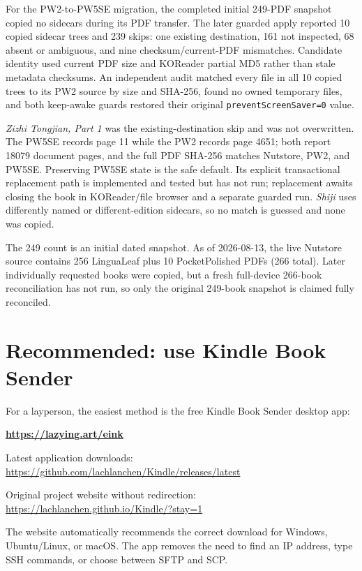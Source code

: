 \documentclass[10pt,letterpaper]{article}
\begin{document}
For the PW2-to-PW5SE migration, the completed initial 249-PDF snapshot copied no sidecars during its PDF transfer. The later guarded apply reported 10 copied sidecar trees and 239 skips: one existing destination, 161 not inspected, 68 absent or ambiguous, and nine checksum/current-PDF mismatches. Candidate identity used current PDF size and KOReader partial MD5 rather than stale metadata checksums. An independent audit matched every file in all 10 copied trees to its PW2 source by size and SHA-256, found no owned temporary files, and both keep-awake guards restored their original \texttt{preventScreenSaver=0} value.

\emph{Zizhi Tongjian, Part 1} was the existing-destination skip and was not overwritten. The PW5SE records page 11 while the PW2 records page 4651; both report 18079 document pages, and the full PDF SHA-256 matches Nutstore, PW2, and PW5SE. Preserving PW5SE state is the safe default. Its explicit transactional replacement path is implemented and tested but has not run; replacement awaits closing the book in KOReader/file browser and a separate guarded run. \emph{Shiji} uses differently named or different-edition sidecars, so no match is guessed and none was copied.

The 249 count is an initial dated snapshot. As of 2026-08-13, the live Nutstore source contains 256 LinguaLeaf plus 10 PocketPolished PDFs (266 total). Later individually requested books were copied, but a fresh full-device 266-book reconciliation has not run, so only the original 249-book snapshot is claimed fully reconciled.

\section{Recommended: use Kindle Book Sender}

For a layperson, the easiest method is the free Kindle Book Sender desktop app:

\begin{center}
\href{https://lazying.art/eink}{\textbf{https://lazying.art/eink}}

Latest application downloads: \url{https://github.com/lachlanchen/Kindle/releases/latest}

Original project website without redirection: \url{https://lachlanchen.github.io/Kindle/?stay=1}
\end{center}

The website automatically recommends the correct download for Windows, Ubuntu/Linux, or macOS. The app removes the need to find an IP address, type SSH commands, or choose between SFTP and SCP.
\end{document}
